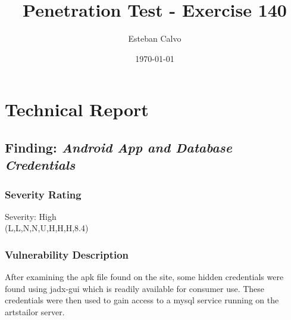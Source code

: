 \documentclass[notitlepage]{article}
\begin{document}
  
\title{Penetration Test - Exercise 140}
\author{Esteban Calvo}
\date{\isodate\today}

\maketitle

\tableofcontents

\newpage

\section{Technical Report}

  \subsection{Finding: \emph{Android App and Database Credentials}}
  
	\subsubsection*{Severity Rating}
        Severity: High \\	   	
		\cvss(L,L,N,N,U,H,H,H,8.4)
		
  	\subsubsection*{Vulnerability Description}
  		After examining the apk file found on the site, some hidden credentials were found using jadx-gui
        which is readily available for consumer use. These credentials were then used to gain access to a mysql
        service running on the artstailor server.
\end{document}
